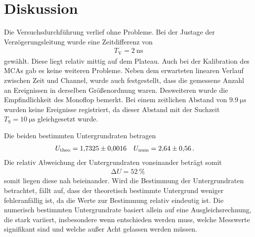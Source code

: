 \section{Diskussion}
\label{sec:Diskussion}
Die Versuchsdurchführung verlief ohne Probleme.
Bei der Justage der Verzögerungsleitung wurde eine Zeitdifferenz von
\begin{align*}
    T_\text{V} = \SI{2}{\nano\second}
\end{align*}
gewählt.
Diese liegt relativ mittig auf dem Plateau.
Auch bei der Kalibration des MCAs gab es keine weiteren Probleme.
Neben dem erwarteten linearen Verlauf zwischen Zeit und Channel, wurde auch festgestellt, dass die gemessene Anzahl an Ereignissen in derselben Größenordnung waren.
Desweiteren wurde die Empfindlichkeit des Monoflop bemerkt.
Bei einem zeitlichen Abstand von $\SI{9.9}{\micro\second}$ wurden keine Ereignisse registriert, da dieser Abstand mit der Suchzeit $T_\text{S} = \SI{10}{\micro\second}$ gleichgesetzt wurde.

\noindent
Die beiden bestimmten Untergrundraten betragen
\begin{align*}
    U_\text{theo} = \num{1.7325 \pm 0.0016} &&       U_\text{num} &= \num{2.64 \pm 0.56} \, .
\end{align*}
Die relativ Abweichung der Untergrundraten voneinander beträgt somit
\begin{align*}
    \increment U = \SI{52}{\percent} \, 
\end{align*} %
somit liegen diese nah beieinander.
Wird die Bestimmung der Untergrundraten betrachtet, fällt auf, dass der theoretisch bestimmte Untergrund weniger fehleranfällig ist, da die Werte zur Bestimmung relativ eindeutig ist.
Die numerisch bestimmten Untergrundrate basiert allein auf eine Ausgleichsrechnung, die stark variiert, insbesondere wenn entschieden werden muss, welche Messwerte signifikant sind und welche außer Acht gelassen werden müssen.

